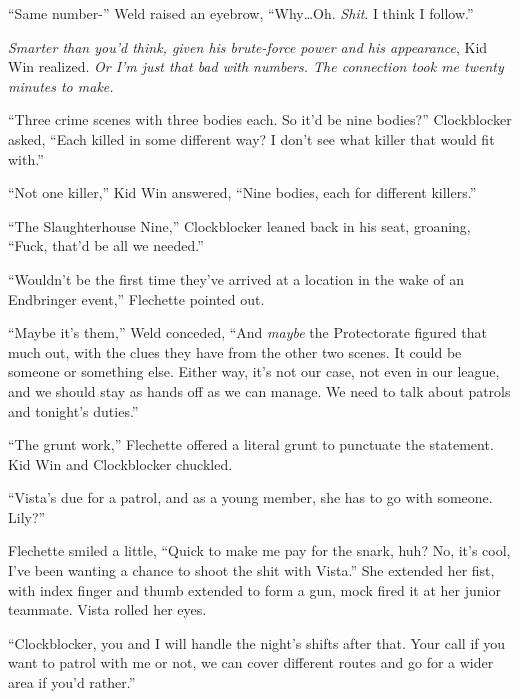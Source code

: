 ``Same number-'' Weld raised an eyebrow, ``Why\ldots Oh.  \emph{Shit}.  I think I follow.''



\emph{Smarter than you'd think, given his brute-force power and his appearance}, Kid Win realized.  \emph{Or I'm just that bad with numbers.  The connection took me twenty minutes to make.}



``Three crime scenes with three bodies each.  So it'd be nine bodies?'' Clockblocker asked, ``Each killed in some different way?  I don't see what killer that would fit with.''



``Not one killer,'' Kid Win answered, ``Nine bodies, each for different killers.''



``The Slaughterhouse Nine,'' Clockblocker leaned back in his seat, groaning, ``Fuck, that'd be all we needed.''



``Wouldn't be the first time they've arrived at a location in the wake of an Endbringer event,'' Flechette pointed out.



``Maybe it's them,'' Weld conceded, ``And \emph{maybe} the Protectorate figured that much out, with the clues they have from the other two scenes.  It could be someone or something else.  Either way, it's not our case, not even in our league, and we should stay as hands off as we can manage.  We need to talk about patrols and tonight's duties.''



``The grunt work,'' Flechette offered a literal grunt to punctuate the statement.  Kid Win and Clockblocker chuckled.



``Vista's due for a patrol, and as a young member, she has to go with someone.  Lily?''



Flechette smiled a little, ``Quick to make me pay for the snark, huh?  No, it's cool, I've been wanting a chance to shoot the shit with Vista.''  She extended her fist, with index finger and thumb extended to form a gun, mock fired it at her junior teammate.  Vista rolled her eyes.



``Clockblocker, you and I will handle the night's shifts after that.  Your call if you want to patrol with me or not, we can cover different routes and go for a wider area if you'd rather.''



